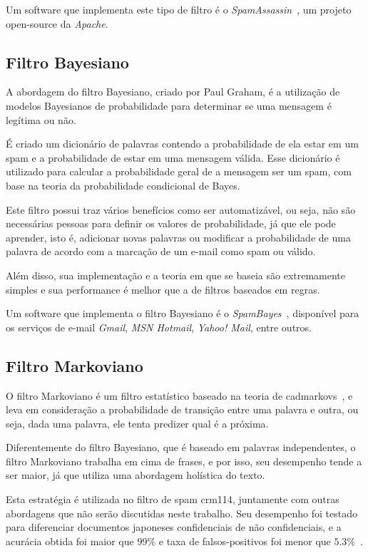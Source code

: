 \documentclass[a4paper,dvipdfm]{article}
\begin{document}
		Um software que implementa este tipo de filtro é o \emph{SpamAssassin}~\cite{spamassassin}, um projeto open-source da \emph{Apache}.

	\subsection{Filtro Bayesiano}
		A abordagem do filtro Bayesiano, criado por Paul Graham, é a utilização de modelos Bayesianos de probabilidade para determinar se uma mensagem é legítima ou não.

		É criado um dicionário de palavras contendo a probabilidade de ela estar em um spam e a probabilidade de estar em uma mensagem válida. Esse dicionário é utilizado para calcular a probabilidade geral de a mensagem ser um spam, com base na teoria da probabilidade condicional de Bayes.

		Este filtro possui traz vários benefícios como ser automatizável, ou seja, não são necessárias pessoas para definir os valores de probabilidade, já que ele pode aprender, isto é, adicionar novas palavras ou modificar a probabilidade de uma palavra de acordo com a marcação de um e-mail como spam ou válido.

		Além disso, sua implementação e a teoria em que se baseia são extremamente simples e sua performance é melhor que a de filtros baseados em regras.
		
		Um software que implementa o filtro Bayesiano é o \emph{SpamBayes}~\cite{spambayes}, disponível para os serviços de e-mail \emph{Gmail}, \emph{MSN Hotmail}, \emph{Yahoo! Mail}, entre outros.

	\subsection{Filtro Markoviano}
		O filtro Markoviano é um filtro estatístico baseado na teoria de \glspl{cadmarkov}~\cite{markov}, e leva em consideração a probabilidade de transição entre uma palavra e outra, ou seja, dada uma palavra, ele tenta predizer qual é a próxima.

		Diferentemente do filtro Bayesiano, que é baseado em palavras independentes, o filtro Markoviano trabalha em cima de frases, e por isso, seu desempenho tende a ser maior, já que utiliza uma abordagem holística do texto.
		
	Esta estratégia é utilizada no filtro de spam \gls{crm114}, juntamente com outras abordagens que não serão discutidas neste trabalho. Seu desempenho foi testado para diferenciar documentos japoneses confidenciais de não confidenciais, e a acurácia obtida foi maior que $99\%$ e taxa de falsos-positivos foi menor que $5.3\%$~\cite{fmarkov:japtest}.
\end{document}
